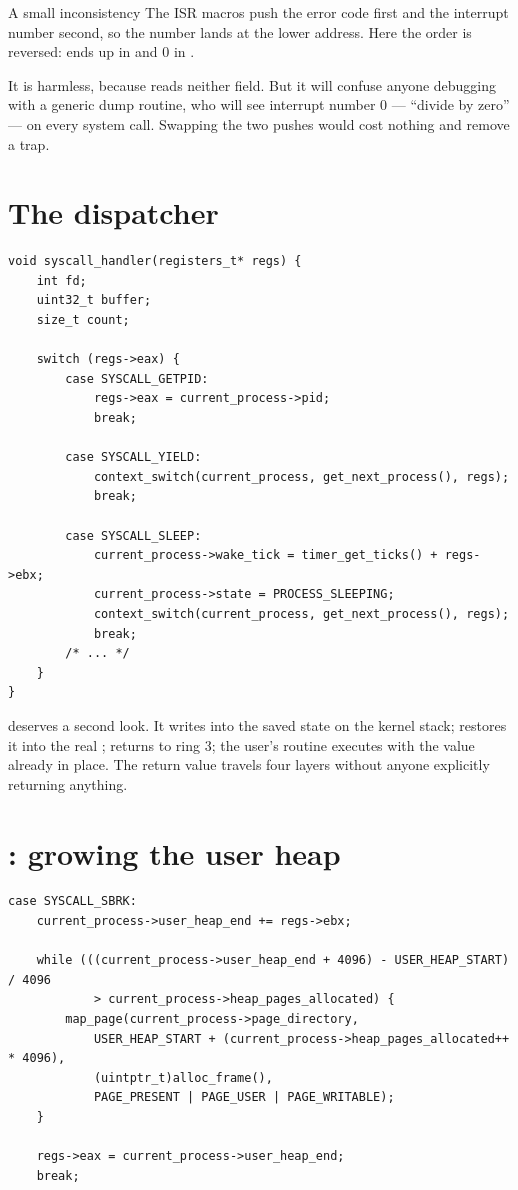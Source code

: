 \begin{warn}{A small inconsistency}
The ISR macros push the error code first and the interrupt number second, so the number lands at the
lower address. Here the order is reversed:  ends up in  and 0 in
.

It is harmless, because  reads neither field. But it will confuse anyone
debugging with a generic dump routine, who will see interrupt number 0 --- ``divide by zero'' --- on
every system call. Swapping the two pushes would cost nothing and remove a trap.
\end{warn}

\section{The dispatcher}

\begin{lstlisting}[style=c]
void syscall_handler(registers_t* regs) {
    int fd;
    uint32_t buffer;
    size_t count;

    switch (regs->eax) {
        case SYSCALL_GETPID:
            regs->eax = current_process->pid;
            break;

        case SYSCALL_YIELD:
            context_switch(current_process, get_next_process(), regs);
            break;

        case SYSCALL_SLEEP:
            current_process->wake_tick = timer_get_ticks() + regs->ebx;
            current_process->state = PROCESS_SLEEPING;
            context_switch(current_process, get_next_process(), regs);
            break;
        /* ... */
    }
}
\end{lstlisting}

 deserves a second look. It writes into the saved state on
the kernel stack;  restores it into the real ;  returns to ring 3; the
user's  routine executes  with the value already in place. The return value
travels four layers without anyone explicitly returning anything.

\section{: growing the user heap}

\begin{lstlisting}[style=c]
case SYSCALL_SBRK:
    current_process->user_heap_end += regs->ebx;

    while (((current_process->user_heap_end + 4096) - USER_HEAP_START) / 4096
            > current_process->heap_pages_allocated) {
        map_page(current_process->page_directory,
            USER_HEAP_START + (current_process->heap_pages_allocated++ * 4096),
            (uintptr_t)alloc_frame(),
            PAGE_PRESENT | PAGE_USER | PAGE_WRITABLE);
    }

    regs->eax = current_process->user_heap_end;
    break;
\end{lstlisting}

